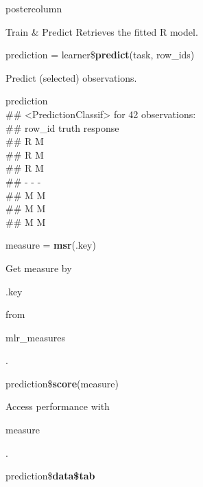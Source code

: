\documentclass{beamer}
\newcommand{\codeinline}[1]{\begin{codeboxinline}#1\end{codeboxinline}}
\begin{document}
\begin{frame}[fragile]{}
\begin{columns}
\begin{column}{.245\textwidth}
\begin{beamercolorbox}[center]{postercolumn}
\begin{minipage}{.98\textwidth}
{\begin{myblock}{Train \& Predict}
						Retrieves the fitted R model.
						\\
						\vspace{1em} %
						\begin{codebox}
							prediction = learner\$\textbf{predict}(task, row\_ids)
						\end{codebox}
                        Predict (selected) observations.
                        \\
                        \begin{codeboxmultiline}[width=23cm]
							{\footnotesize prediction\\
							\#\# <PredictionClassif> for 42 observations:\\
							\#\# row\_id truth response\\
							\#\# \space\space\space\space\space 2
							\space\space\space\space R \space\space\space\space\space\space\space M\\
							\#\# \space\space\space\space\space 3
							\space\space\space\space R \space\space\space\space\space\space\space M\\
							\#\# \space\space\space\space\space 5
							\space\space\space\space R \space\space\space\space\space\space\space M\\
							\#\# - - -\\
							\#\# \space\space\space 198
							\space\space\space\space M \space\space\space\space\space\space\space M\\
							\#\# \space\space{}00
							\space\space\space\space M \space\space\space\space\space\space\space M\\
							\#\# \space\space\space 207
							\space\space\space\space M \space\space\space\space\space\space\space M}
                        \end{codeboxmultiline}
                        \vspace{1em}
						\begin{codebox}
							measure = \textbf{msr}(.key)
						\end{codebox}
						Get measure by \codeinline{.key} from \codeinline{mlr\_measures}.
						\\
						\begin{codebox}
							prediction\$\textbf{score}(measure)
						\end{codebox}
						Access performance with \codeinline{measure}.
						\\
						\begin{codebox}
							prediction\$\textbf{data\$tab}

\end{codebox}
\end{myblock}}
\end{minipage}
\end{beamercolorbox}
\end{column}
\end{columns}
\end{frame}
\end{document}
